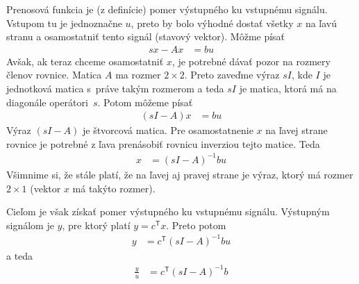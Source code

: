 \documentclass[a4paper, 10pt, ]{article}
\begin{document}
Prenosová funkcia je (z definície) pomer výstupného ku vstupnému signálu. Vstupom tu je jednoznačne $u$, preto by bolo výhodné dostať všetky $x$ na ľavú stranu a osamostatniť tento signál (stavový vektor). Môžme písať
\begin{align}
    s x - A x  &=  b u
\end{align}
Avšak, ak teraz chceme osamostatniť $x$, je potrebné dávať pozor na rozmery členov rovnice. Matica $A$ ma rozmer $2\times2$. Preto zaveďme výraz $sI$, kde $I$ je jednotková matica s~práve takým rozmerom a teda $sI$ je matica, ktorá má na diagonále operátori~$s$. Potom môžeme písať
\begin{align}
    \left(sI - A\right) x  &=  b u
\end{align}
Výraz $\left(sI - A\right)$ je štvorcová matica. Pre osamostatnenie $x$ na ľavej strane rovnice je potrebné z ľava prenásobiť rovnicu inverziou tejto matice. Teda
\begin{align}
     x  &=  \left(sI - A\right)^{-1} b u
\end{align}
Všimnime si, že stále platí, že na ľavej aj pravej strane je výraz, ktorý má rozmer $2\times1$ (vektor $x$ má takýto rozmer).

Cieľom je však získať pomer výstupného ku vstupnému signálu. Výstupným signálom je $y$, pre ktorý platí $y = c^\mathsf T x$. Preto potom
\begin{align}
     y  &=  c^\mathsf T\left(sI - A\right)^{-1} b u
\end{align}
a teda
\begin{align} \label{tfifoss}
     \frac{y}{u} &=  c^\mathsf T\left(sI - A\right)^{-1} b
\end{align}
\end{document}
